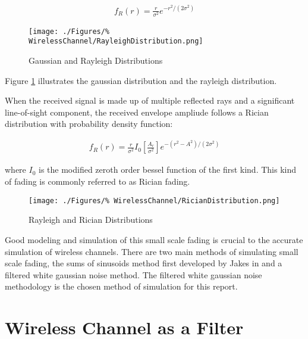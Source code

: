 \begin{align}
	f_{R}(r) = \frac{r}{\sigma^{2}}e^{-r^{2}/(2\sigma^{2})}
	\label{eq:RayleighPDF}
\end{align}

\begin{figure}[h!]
	\texttt{[image: ./Figures/\%
	WirelessChannel/RayleighDistribution.png]}
	\caption{Gaussian and Rayleigh Distributions%
	\cite{Jakes74}}
	\label{fig:RayleighDistribution}
\end{figure}

Figure \ref{fig:RayleighDistribution} illustrates %
the gaussian distribution and the rayleigh %
distribution.

When the received signal is made up of multiple %
reflected rays and a significant line-of-sight %
component, the received envelope ampliude %
follows a Rician distribution with probability density %
function:

\begin{align}
	f_{R}(r) = \frac{r}{\sigma^{2}}I_{0}%
	\left[ \frac{A_{r}}{\sigma^{2}} \right]%
	e^{-(r^{2}-A^{2})/(2 \sigma^{2})}
	\label{eq:RicianPDF}
\end{align}

where $I_{0}$ is the modified zeroth order %
bessel function of the first kind. This kind of %
fading is commonly referred to as Rician fading. 

\begin{figure}[h!]
	\texttt{[image: ./Figures/\%
	WirelessChannel/RicianDistribution.png]}
	\caption{Rayleigh and Rician Distributions}
	\label{fig:RicianDistribution}
\end{figure}




Good modeling and simulation of this small scale fading %
is crucial to the accurate simulation of wireless channels. %
There are two main methods of simulating small scale fading, %
the sums of sinusoids method first developed by Jakes in %
\cite{Jakes74} and a filtered white gaussian noise method. %
The filtered white gaussian noise methodology is the chosen %
method of simulation for this report.

\section{Wireless Channel as a Filter}





